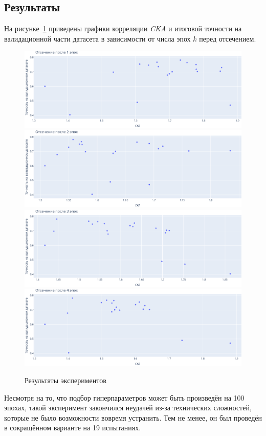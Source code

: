 \subsection*{Результаты}
На рисунке~\ref{fig:result} приведены графики корреляции \textit{CKA} и итоговой точности на валидационной части датасета в зависимости от числа эпох $k$ перед отсечением.
\begin{figure}[ht]
  \includegraphics[width=\linewidth]{imgs/1_epochs.png}
  \includegraphics[width=\linewidth]{imgs/2_epochs.png}
  \includegraphics[width=\linewidth]{imgs/3_epochs.png}
  \includegraphics[width=\linewidth]{imgs/4_epochs.png}
  \label{fig:result}
  \caption{Результаты экспериментов}
\end{figure}
Несмотря на то, что подбор гиперпараметров может быть произведён на 100 эпохах, такой эксперимент закончился неудачей из-за технических сложностей, которые не было возможности вовремя устранить.
Тем не менее, он был проведён в сокращённом варианте на 19 испытаниях.

